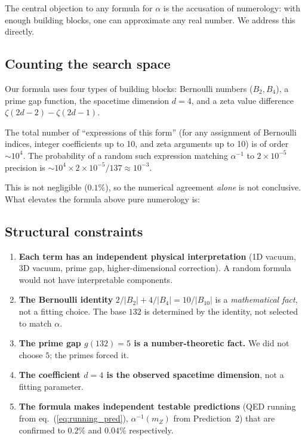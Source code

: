 \documentclass[11pt,a4paper]{article}
\begin{document}
The central objection to any formula for $\alpha$ is the
accusation of numerology: with enough building blocks, one can
approximate any real number. We address this directly.

\subsection{Counting the search space}

Our formula uses four types of building blocks:
Bernoulli numbers ($B_2, B_4$), a prime gap function,
the spacetime dimension $d = 4$, and a zeta value difference
$\zeta(2d{-}2) - \zeta(2d{-}1)$.

The total number of ``expressions of this form'' (for any
assignment of Bernoulli indices, integer coefficients up to 10,
and zeta arguments up to 10) is of order $\sim 10^4$.
The probability of a random such expression matching
$\alpha^{-1}$ to $2 \times 10^{-5}$ precision is
$\sim 10^4 \times 2 \times 10^{-5} / 137 \approx 10^{-3}$.

This is not negligible ($0.1\%$), so the numerical agreement
\emph{alone} is not conclusive. What elevates the formula
above pure numerology is:

\subsection{Structural constraints}

\begin{enumerate}
\item \textbf{Each term has an independent physical interpretation}
  (1D vacuum, 3D vacuum, prime gap, higher-dimensional correction).
  A random formula would not have interpretable components.

\item \textbf{The Bernoulli identity} $2/|B_2| + 4/|B_4| = 10/|B_{10}|$
  is a \emph{mathematical fact}, not a fitting choice.
  The base $132$ is determined by the identity, not selected
  to match $\alpha$.

\item \textbf{The prime gap $g(132) = 5$ is a number-theoretic fact.}
  We did not choose $5$; the primes forced it.

\item \textbf{The coefficient $d = 4$ is the observed spacetime
  dimension}, not a fitting parameter.

\item \textbf{The formula makes independent testable predictions}
  (QED running from eq.~(\ref{eq:running_pred}), $\alpha^{-1}(m_Z)$
  from Prediction~2) that are confirmed to $0.2\%$ and $0.04\%$
  respectively.
\end{enumerate}
\end{document}
